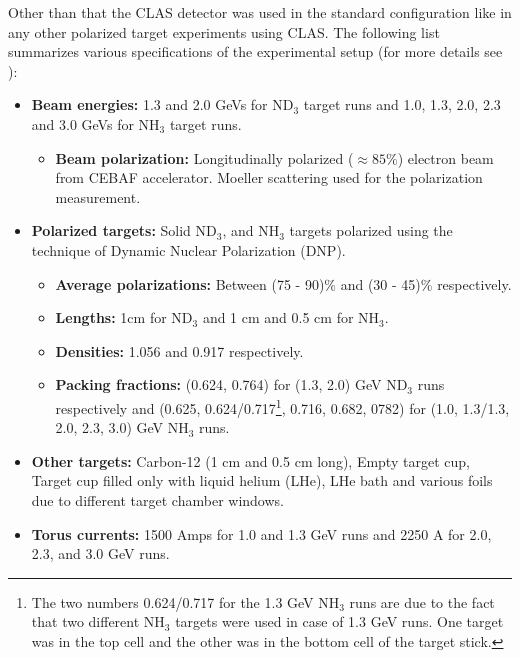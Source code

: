 Other than that the CLAS detector was used in the standard configuration like in any other polarized target experiments using CLAS. The following list summarizes various specifications of the experimental setup (for more details see \cite{anaNoteXZheng}):
\begin{itemize}
\item \textbf{Beam energies:} 1.3 and 2.0 GeVs for ND$_3$ target runs and 1.0, 1.3, 2.0, 2.3 and 3.0 GeVs for NH$_3$ target runs.
\begin{itemize}
\item \textbf{Beam polarization: } Longitudinally polarized ($\approx 85\%$) electron beam from CEBAF accelerator. Moeller scattering used for the polarization measurement.
\end{itemize}
\item \textbf{Polarized targets: } Solid ND$_3$, and NH$_3$ targets polarized using the technique of Dynamic Nuclear Polarization (DNP).
\begin{itemize}
\item \textbf{Average polarizations: } Between (75 - 90)$\%$ and  (30 - 45)$\%$ respectively.
\item \textbf{Lengths: } 1cm for ND$_3$ and 1 cm and 0.5 cm for  NH$_3$.
\item \textbf{Densities: } 1.056 and 0.917 respectively.
\item \textbf{Packing fractions: } (0.624, 0.764) for (1.3, 2.0) GeV  ND$_3$ runs respectively and (0.625, 0.624/0.717\footnote{The two numbers 0.624/0.717 for the 1.3 GeV NH$_3$ runs are due to the fact that two different NH$_3$ targets were used in case of 1.3 GeV runs. One target was in the top cell and the other was in the bottom cell of the target stick.}, 0.716, 0.682, 0782) for (1.0, 1.3/1.3, 2.0, 2.3, 3.0) GeV NH$_3$ runs.  
\end{itemize}  
\item \textbf{Other targets: } Carbon-12 (1 cm and 0.5 cm long), Empty target cup, Target cup filled only with liquid helium (LHe), LHe bath and various foils due to different target chamber windows. 
\item \textbf{Torus currents: } 1500 Amps for 1.0 and 1.3 GeV runs and 2250 A for 2.0, 2.3, and 3.0 GeV runs.
\end{itemize}  

